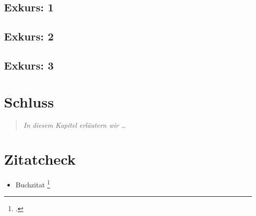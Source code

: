 \documentclass[DIV=calc,BCOR=5mm,11pt,headings=small,oneside,abstract=true,toc=bib]{scrbook}
\begin{document}
\section{Exkurs: 1}

\section{Exkurs: 2}

\section{Exkurs: 3}

\chapter{Schluss}
\begin{quote}\itshape
In diesem Kapitel erläutern wir \ldots
\end{quote}


\chapter{Zitatcheck}
\begin{itemize}
  \item Buchzitat \footcite[vgl.][15]{AllHen2008a}
\end{itemize}

\small




\printnomenclature


\end{document}
